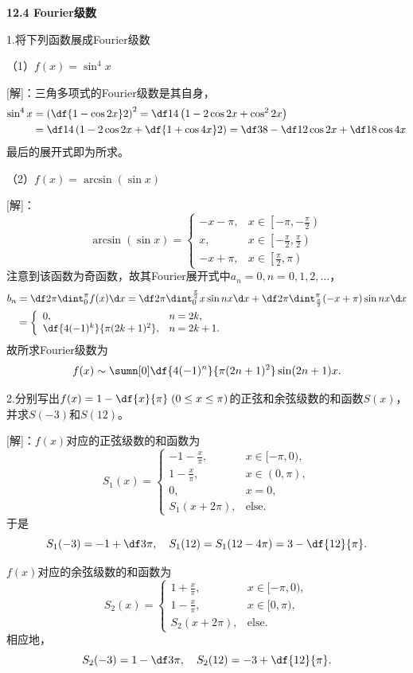 \begin{center}
	\bf 12.4 Fourier级数
\end{center}

1.将下列函数展成Fourier级数

（1）$f(x)=\sin^4x$

[解]：三角多项式的Fourier级数是其自身，
\begin{align*}
	\sin^4x&=\left(\df{1-\cos2x}2\right)^2
	=\df14\left(1-2\cos2x+\cos^22x\right)\\
	&=\df14\left(1-2\cos2x+\df{1+\cos4x}2\right)
	=\df38-\df12\cos2x+\df18\cos4x
\end{align*}
最后的展开式即为所求。

（2）$f(x)=\arcsin(\sin x)$

[解]：
$$\arcsin(\sin x)=\left\{\begin{array}{ll}
	-x-\pi, & x\in\left[-\pi,-\frac{\pi}2\right)\\
	x, & x\in\left[-\frac{\pi}2,\frac{\pi}2\right)\\
	-x+\pi, & x\in\left[\frac{\pi}2,\pi\right)
\end{array}\right.$$
注意到该函数为奇函数，故其Fourier展开式中$a_n=0,n=0,1,2,\ldots$，
\begin{align*}
	b_n&=\df2{\pi}\dint_0^{\pi}f(x)\d x
	=\df2{\pi}\dint_0^{\frac{\pi}2}x\sin nx\d x
	+\df2{\pi}\dint_{\frac{\pi}2}^{\pi}(-x+\pi)\sin nx\d x\\
	&=\left\{\begin{array}{ll}
		0, & n=2k,\\ \df{4(-1)^k}{\pi(2k+1)^2}, & n=2k+1.
	\end{array}\right.
\end{align*}
故所求Fourier级数为
$$f(x)\sim\sumn[0]\df{4(-1)^n}{\pi(2n+1)^2}\sin(2n+1)x.$$
\fin

\bs

2.分别写出$f(x)=1-\df{x}{\pi}\;(0\leq x\leq\pi)$的正弦和余弦级数的和函数$S(x)$，
并求$S(-3)$和$S(12)$。

[解]：$f(x)$对应的正弦级数的和函数为
$$S_1(x)=\left\{\begin{array}{ll}
	-1-\frac x{\pi}, & x\in[-\pi,0),\\
	1-\frac x{\pi}, & x\in(0,\pi),\\
	0, & x=0,\\
	S_1(x+2\pi), & \mathrm{else}.
\end{array}\right.$$
于是
$$S_1(-3)=-1+\df3{\pi},\quad
S_1(12)=S_1(12-4\pi)=3-\df{12}{\pi}.$$

$f(x)$对应的余弦级数的和函数为
$$S_2(x)=\left\{\begin{array}{ll}
	1+\frac x{\pi}, & x\in[-\pi,0),\\
	1-\frac x{\pi}, & x\in[0,\pi),\\
	S_2(x+2\pi), & \mathrm{else}.
\end{array}\right.$$
相应地，
$$S_2(-3)=1-\df3{\pi},\quad
S_2(12)=-3+\df{12}{\pi}.$$
\fin

